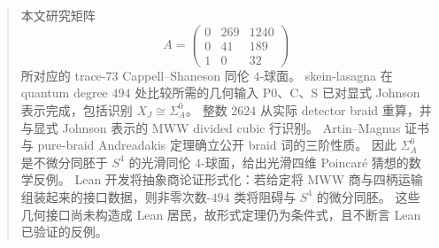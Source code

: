 
\begin{abstract}
本文研究矩阵
\[
A=\begin{pmatrix}0&269&1240\\0&41&189\\1&0&32\end{pmatrix}
\]
所对应的 trace-73 Cappell--Shaneson 同伦 $4$-球面。
skein-lasagna 在 quantum degree $494$ 处比较所需的几何输入 P0、C、S 已对显式 Johnson 表示完成，包括识别 $X_J\cong\Sigma_A^0$。
整数 $2624$ 从实际 detector braid 重算，并与显式 Johnson 表示的 MWW divided cubic 行识别。
Artin--Magnus 证书与 pure-braid Andreadakis 定理确立公开 braid 词的三阶性质。
因此 $\Sigma_A^0$ 是不微分同胚于 $S^4$ 的光滑同伦 $4$-球面，给出光滑四维 Poincaré 猜想的数学反例。
Lean 开发将抽象商论证形式化：若给定将 MWW 商与四柄运输组装起来的接口数据，则非零次数-$494$ 类将阻碍与 $S^4$ 的微分同胚。
这些几何接口尚未构造成 Lean 居民，故形式定理仍为条件式，且不断言 Lean 已验证的反例。
\end{abstract}

\maketitle
\tableofcontents

